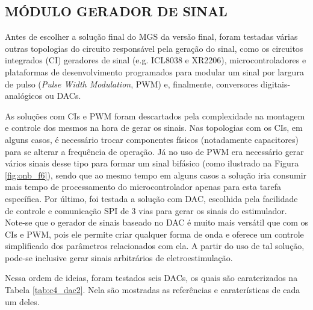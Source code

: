 \subsection{MÓDULO GERADOR DE SINAL} \label{cap:sec4.2.2}
Antes de escolher a solução final do \acrshort{MGS} da versão final, foram testadas várias outras topologias do circuito responsável pela geração do sinal, como os circuitos integrados (\acrshort{CI}) geradores de sinal (e.g. ICL8038 e XR2206), microcontroladores e plataformas de desenvolvimento programados para modular um sinal por largura de pulso (\textit{Pulse Width Modulation}, \acrshort{PWM}) e, finalmente, conversores digitais-analógicos ou \acrshort{DAC}s.

As soluções com \acrshort{CI}s e \acrshort{PWM} foram descartados pela complexidade na montagem e controle dos mesmos na hora de gerar os sinais. Nas topologias com os \acrshort{CI}s, em alguns casos, é necessário trocar componentes físicos (notadamente capacitores) para se alterar a frequência de operação. Já no uso de \acrshort{PWM} era necessário gerar vários sinais desse tipo para formar um sinal bifásico (como ilustrado na Figura \ref{fig:onb_f6}), sendo que ao mesmo tempo em alguns casos a solução iria consumir mais tempo de processamento do microcontrolador apenas para esta tarefa específica. Por último, foi testada a solução com \acrshort{DAC}, escolhida pela facilidade de controle e comunicação \acrshort{SPI} de 3 vias para gerar os sinais do estimulador. Note-se que o gerador de sinais baseado no \acrshort{DAC} é muito mais versátil que com os \acrshort{CI}s e \acrshort{PWM}, pois ele permite criar qualquer forma de onda e oferece um controle simplificado dos parâmetros relacionados com ela. A partir do uso de tal solução, pode-se inclusive gerar sinais arbitrários de eletroestimulação.

Nessa ordem de ideias, foram testados seis \acrshort{DAC}s, os quais são caraterizados na Tabela \ref{tab:c4_dac2}. Nela são mostradas as referências e caraterísticas de cada um deles.

